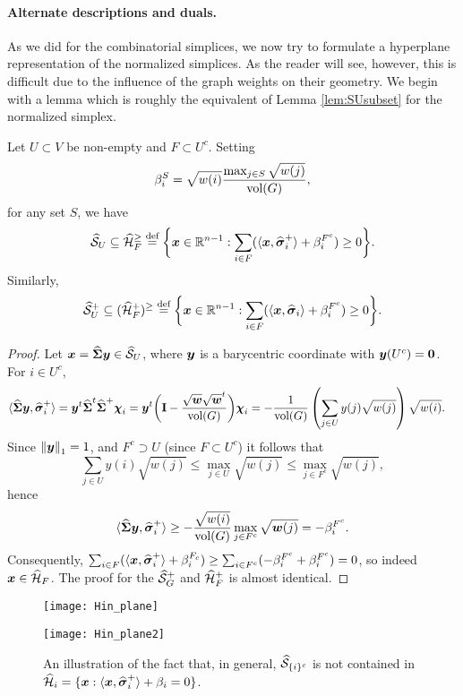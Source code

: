 \paragraph{Alternate descriptions and duals.} As we did for the combinatorial simplices, we now try to formulate a hyperplane representation of the normalized simplices. As the reader will see, however, this is difficult due to the influence of the graph weights on their geometry. We begin with a lemma which is roughly the equivalent of Lemma \ref{lem:SUsubset} for the normalized simplex. 

\begin{lemma}
	\label{lem:SUn_subset}
	Let $U\subset V$ be non-empty and $F\subset U^c$. Setting 
	\[\beta_i^S = \sqrt{w(i)} \frac{\max_{j\in S} \sqrt{w(j)}}{\textnormal{vol}(G)},\]
	for any set $S$, we have 
	\begin{equation*}
	\widehat{\mathcal{S}}_U \subseteq \widehat{\mathcal{H}}_{F}^\geq \overset{\text{def}}{=} \bigg\{\vb*{x}\in\mathbb{R}^{n-1}: \sum_{i\in F} (\langle \vb*{x},\widehat{\vb*{\sigma}}_i^+\rangle + \beta_i^{F^c})\ge 0\bigg\}.
	\end{equation*}
	Similarly, 
	\begin{equation*}
	\widehat{\mathcal{S}}^+_U \subseteq (\widehat{\mathcal{H}}^+_{F})^\geq \overset{\text{def}}{=} \bigg\{\vb*{x}\in\mathbb{R}^{n-1}: \sum_{i\in F} (\langle \vb*{x},\widehat{\vb*{\sigma}}_i\rangle + \beta_i^{F^c})\ge 0\bigg\}.
	\end{equation*}
\end{lemma} 
\begin{proof}
	Let $\vb*{x}=\widehat{\boldsymbol{\Sigma}}\vb*{y}\in \widehat{\mathcal{S}}_U$, where $\vb*{y}$  is a barycentric coordinate with $\vb*{y}(U^c)=\vb{0}$. For $i\in U^c$, 
	\begin{align*}
	\langle \widehat{\boldsymbol{\Sigma}}\vb*{y},\widehat{\vb*{\sigma}}_i^+ \rangle &= \vb*{y}^t \widehat{\boldsymbol{\Sigma}}^t \widehat{\boldsymbol{\Sigma}}^+ \boldsymbol{\chi}_i = \vb*{y}^t \bigg(\vb{I}-\frac{\sqrt{\vb*{w}}\sqrt{\vb*{w}}^t}{\textnormal{vol}(G)}\bigg)\boldsymbol{\chi}_i = - \frac{1}{\textnormal{vol}(G)} \left(\sum_{j\in U}y(j) \sqrt{w(j)}\right) \sqrt{w(i)}.
	\end{align*}
	Since $\norm{\vb*{y}}_1=1$, and $F^c\supset U$ (since $F\subset U^c$) it follows that 
	\[\sum_{j\in U}y(i) \sqrt{w(j)} \leq \max_{j\in U} \sqrt{w(j)} \leq \max_{j\in F^c}\sqrt{w(j)},\]
	hence 
	\[\langle \widehat{\boldsymbol{\Sigma}}\vb*{y},\widehat{\vb*{\sigma}}_i^+\rangle \geq -\frac{\sqrt{w(i)}}{\textnormal{vol}(G)} \max_{j\in F^c}\sqrt{\vb*{w}(j)} = -\beta_i^{F^c}.\]  
	Consequently, $\sum_{i\in F} (\langle \vb*{x},\widehat{\vb*{\sigma}}_i^+\rangle + \beta_i^{F_c}) \geq \sum_{i\in F^c}(-\beta_i^{F^c} +\beta_i^{F^c})=0$, so indeed $\vb*{x}\in \widehat{\mathcal{H}}_F$. The proof for the $\widehat{\mathcal{S}}^+_G$ and $\widehat{\mathcal{H}}_F^+$ is almost identical. 
\end{proof}

\begin{figure}
	\centering
	\begin{minipage}{0.45\textwidth}
		\centering
		\texttt{[image: Hin\_plane]}
		\subcaption{}
	\end{minipage}
	\begin{minipage}{0.45\textwidth}
	\centering
	\texttt{[image: Hin\_plane2]}
	\subcaption{}
\end{minipage}
\caption{An illustration of the fact that, in general, $\widehat{\mathcal{S}}_{\{i\}^c}$ is not contained in $\widehat{\mathcal{H}}_i=\{\vb*{x}:\langle \vb*{x},\widehat{\vb*{\sigma}}_i^+\rangle + \beta_i=0\}$. }
\label{fig:Hin_planes}
\end{figure}

